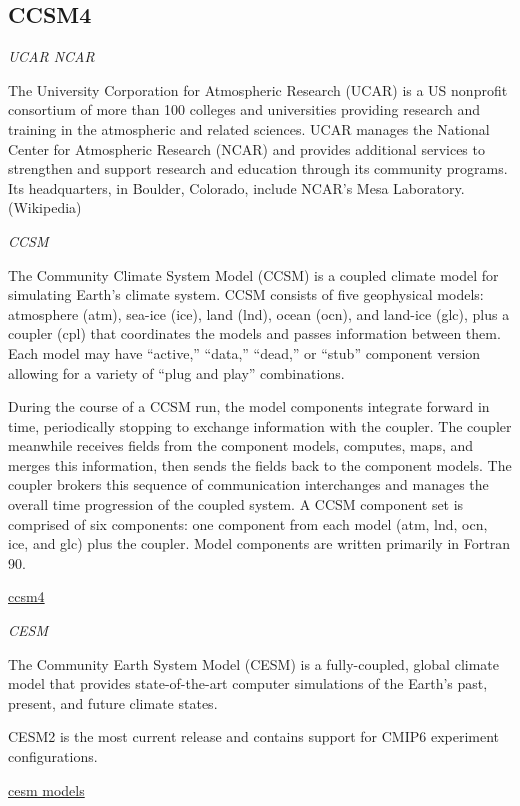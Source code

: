 \documentclass[
]{book}
\begin{document}
\hypertarget{ccsm4}{%
\subsection{CCSM4}\label{ccsm4}}

\emph{UCAR NCAR}

The University Corporation for Atmospheric Research (UCAR) is a
US nonprofit consortium of more than 100 colleges and universities providing
research and training in the atmospheric and related sciences.
UCAR manages the National Center for Atmospheric Research (NCAR) and
provides additional services to strengthen and support research and education
through its community programs.
Its headquarters, in Boulder, Colorado, include NCAR's Mesa Laboratory. (Wikipedia)

\emph{CCSM}

The Community Climate System Model (CCSM) is a
coupled climate model for simulating Earth's climate system.
CCSM consists of five geophysical models:
atmosphere (atm), sea-ice (ice), land (lnd), ocean (ocn), and land-ice (glc),
plus a coupler (cpl) that coordinates the models and passes information between them.
Each model may have ``active,'' ``data,'' ``dead,'' or ``stub'' component version allowing
for a variety of ``plug and play'' combinations.

During the course of a CCSM run, the model components integrate forward in time, periodically stopping to exchange information with the coupler. The coupler meanwhile receives fields from the component models, computes, maps, and merges this information, then sends the fields back to the component models. The coupler brokers this sequence of communication interchanges and manages the overall time progression of the coupled system. A CCSM component set is comprised of six components: one component from each model (atm, lnd, ocn, ice, and glc) plus the coupler. Model components are written primarily in Fortran 90.

\href{https://www.cesm.ucar.edu/models/ccsm4.0/ccsm_doc/x42.html\#ccsm_machines}{ccsm4}

\emph{CESM}

The Community Earth System Model (CESM) is a fully-coupled, global climate model that provides state-of-the-art computer simulations of the Earth's past, present, and future climate states.

CESM2 is the most current release and contains support for CMIP6 experiment configurations.

\href{https://www.cesm.ucar.edu/models/}{cesm models}
\end{document}
